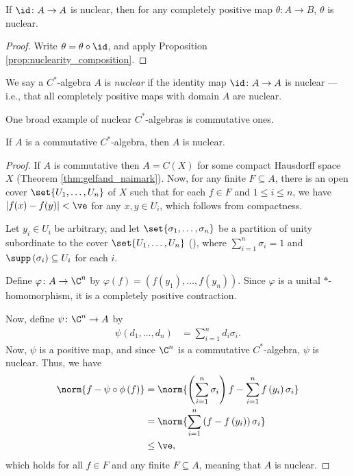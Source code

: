 \begin{corollary}
  If $\id\colon A\rightarrow A$ is nuclear, then for any completely positive map $\theta\colon A\rightarrow B$, $\theta$ is nuclear.
\end{corollary}
\begin{proof}
  Write $\theta = \theta\circ \id$, and apply Proposition \ref{prop:nuclearity_composition}.
\end{proof}
\begin{definition}\label{def:nuclear_cstar_algebra}
  We say a $C^{\ast}$-algebra $A$ is \textit{nuclear} if the identity map $\id\colon A\rightarrow A$ is nuclear --- i.e., that all completely positive maps with domain $A$ are nuclear.
\end{definition}
One broad example of nuclear $C^{\ast}$-algebras is commutative ones.
\begin{proposition}
  If $A$ is a commutative $C^{\ast}$-algebra, then $A$ is nuclear.
\end{proposition}
\begin{proof}
  If $A$ is commutative then $A = C\left( X \right)$ for some compact Hausdorff space $X$ (Theorem \ref{thm:gelfand_naimark}). Now, for any finite $F\subseteq A$, there is an open cover $\set{U_1,\dots,U_n}$ of $X$ such that for each $f\in F$ and $1 \leq i \leq n$, we have $\left\vert f(x) - f(y) \right\vert < \ve$ for any $x,y\in U_i$, which follows from compactness.\newline

  Let $y_i\in U_i$ be arbitrary, and let $\set{\sigma_1,\dots,\sigma_n}$ be a partition of unity subordinate to the cover $\set{U_1,\dots,U_n}$ (\cite[Proposition 4.41]{folland_real_analysis}), where $\sum_{i=1}^{n}\sigma_i = 1$ and $\supp\left( \sigma_i \right) \subseteq U_i$ for each $i$.\newline

  Define $\varphi\colon A\rightarrow \C^n$ by $\varphi\left( f \right) = \left( f\left(y_1\right),\dots,f\left( y_n \right) \right)$. Since $\varphi$ is a unital $\ast$-homomorphism, it is a completely positive contraction.\newline

  Now, define $\psi\colon \C^n\rightarrow A$ by
  \begin{align*}
    \psi\left( d_1,\dots,d_n \right) &= \sum_{i=1}^{n}d_i\sigma_i.
  \end{align*}
  Now, $\psi$ is a positive map, and since $\C^n$ is a commutative $C^{\ast}$-algebra, $\psi$ is nuclear. Thus, we have
  \begin{align*}
    \norm{f - \psi\circ\phi\left( f \right)} &= \norm{\left( \sum_{i=1}^{n}\sigma_i \right)f - \sum_{i=1}^{n}f\left( y_i \right)\sigma_i}\\
                                             &= \norm{\sum_{i=1}^{n}\left( f-f\left( y_i \right) \right)\sigma_i}\\
                                             &\leq \ve,
  \end{align*}
  which holds for all $f\in F$ and any finite $F\subseteq A$, meaning that $A$ is nuclear.
\end{proof}
